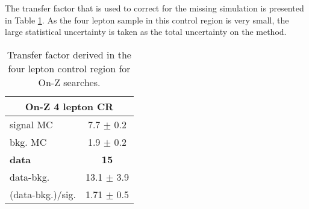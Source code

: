 The transfer factor that is used to correct for the missing simulation is presented in Table \ref{tab:ZZonZ}.
As the four lepton sample in this control region is very small, the large statistical uncertainty is taken as the total uncertainty on the method.
\begin{table}[ht!]
\def\arraystretch{1.2}
\setlength{\belowcaptionskip}{6pt}
\small
\centering
\caption{Transfer factor derived in the four lepton control region for On-Z searches.}
\label{tab:ZZonZ}
\begin{tabular}{l c }
\hline \hline
\multicolumn{2}{c}{On-Z 4 lepton CR}  \\\hline
signal MC        & 7.7     $\pm$  0.2   \\
bkg. MC          & 1.9  $\pm$  0.2\\ \hline
\textbf{data}       & \textbf{15}  \\
data-bkg.        &  13.1   $\pm$  3.9 \\ \hline
(data-bkg.)/sig. & 1.71   $\pm$  0.5\\\hline\hline
\end{tabular}
\end{table}

